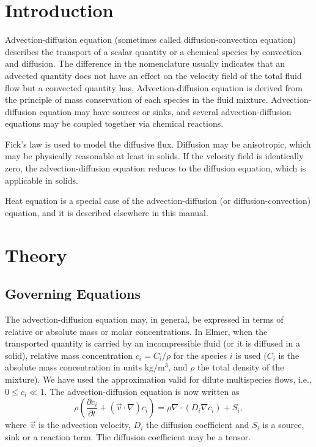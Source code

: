 \noindent
{}
\begin{versiona}

\section{Introduction}

Advection-diffusion equation (sometimes called diffusion-convection equation)
describes the transport of a scalar quantity or a chemical species by
convection and diffusion. The difference in the nomenclature usually indicates
that an advected quantity does not have an effect on the velocity field of
the total fluid flow but a convected quantity has. Advection-diffusion equation
is derived from the principle of mass conservation of each species in the fluid
mixture. Advection-diffusion equation may have sources or sinks, and several
advection-diffusion equations may be coupled together via chemical reactions.

Fick's law is used to model the diffusive flux. Diffusion may be anisotropic,
which may be physically reasonable at least in solids. If the velocity field
is identically zero, the advection-diffusion equation reduces to the diffusion
equation, which is applicable in solids.

Heat equation is a special case of the advection-diffusion
(or diffusion-convection) equation, and it is described elsewhere in this
manual.

\section{Theory}

\subsection{Governing Equations}

The advection-diffusion equation may, in general, be expressed in
terms of relative or absolute mass or molar concentrations. In Elmer,
when the transported quantity is carried by an incompressible fluid
(or it is diffused in a solid), relative mass concentration
$c_i=C_i/\rho$ for the species $i$ is used ($C_i$ is the absolute mass
concentration in units $\mathrm{kg}/\mathrm{m}^3$, and $\rho$ the
total density of the mixture). We have used the approximation valid
for dilute multispecies flows, i.e., $0\le c_i\ll 1$.  The
advection-diffusion equation is now written as
\begin{equation}
\rho  \left( \frac{\partial c_i}{\partial t}+(\vec v\cdot\nabla) c_i\right) = 
\rho\nabla\cdot(D_i\nabla c_i) + S_i,
\end{equation}
where $\vec v$ is the advection velocity, $D_i$ the diffusion coefficient
and $S_i$ is a source, sink or a reaction term. The diffusion coefficient may
be a tensor.


\end{versiona}
